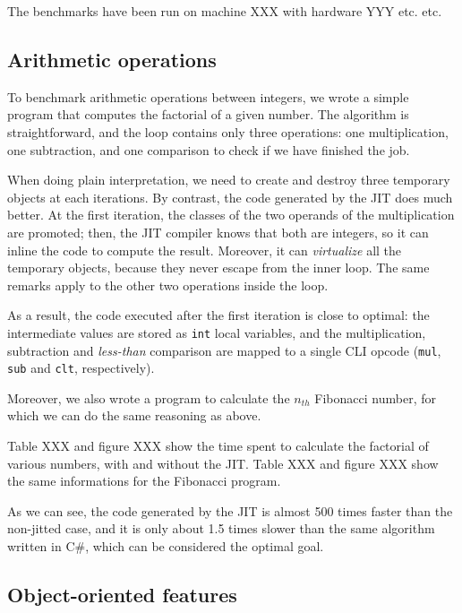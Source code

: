 The benchmarks have been run on machine XXX with hardware YYY etc. etc.

\subsection{Arithmetic operations}

To benchmark arithmetic operations between integers, we wrote a simple program
that computes the factorial of a given number.  The algorithm is
straightforward, and the loop contains only three operations: one
multiplication, one subtraction, and one comparison to check if we have
finished the job.

When doing plain interpretation, we need to create and destroy three temporary
objects at each iterations.  By contrast, the code generated by the JIT does
much better.  At the first iteration, the classes of the two operands of the
multiplication are promoted; then, the JIT compiler knows that both are
integers, so it can inline the code to compute the result.  Moreover, it can
\emph{virtualize} all the temporary objects, because they never escape from
the inner loop.  The same remarks apply to the other two operations inside
the loop.

As a result, the code executed after the first iteration is close to optimal:
the intermediate values are stored as \lstinline{int} local variables, and the
multiplication, subtraction and \emph{less-than} comparison are mapped to a
single CLI opcode (\lstinline{mul}, \lstinline{sub} and \lstinline{clt},
respectively).

Moreover, we also wrote a program to calculate the $n_{th}$ Fibonacci number,
for which we can do the same reasoning as above.

Table XXX and figure XXX show the time spent to calculate the factorial of
various numbers, with and without the JIT.  Table XXX and figure XXX show the
same informations for the Fibonacci program.


As we can see, the code generated by the JIT is almost 500 times faster than
the non-jitted case, and it is only about 1.5 times slower than the same
algorithm written in C\#, which can be considered the optimal goal.

\subsection{Object-oriented features}

